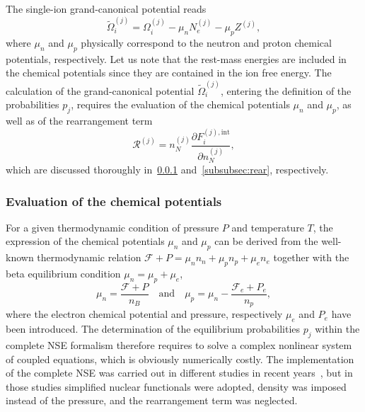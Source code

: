 The single-ion grand-canonical potential reads
%
\begin{equation}
  \tilde{\Omega}_{i}^{(j)} = \Omega_{i}^{(j)} - \mu_n N_e^{(j)} -
  \mu_p Z^{(j)},
\end{equation}
%
where $\mu_n$ and $\mu_p$ physically correspond to the neutron and proton 
chemical potentials, respectively. Let us note that the rest-mass energies are 
included in the chemical potentials since they are contained in the ion 
free energy. 
The calculation of the grand-canonical potential $\tilde{\Omega}_{i}^{(j)}$, 
entering the definition of the probabilities $p_j$, requires the 
evaluation of the chemical potentials $\mu_n$ and $\mu_p$, as well as of the 
rearrangement term
%
\begin{equation}
  \mathcal{R}^{(j)} = n_N^{(j)} 
  \frac{\partial F_i^{(j),\text{int}}}{\partial n_N^{(j)}},
\end{equation}
%
which are discussed thoroughly in~\ref{subsubsec:chempoteval}
and~\ref{subsubsec:rear}, respectively.

\subsubsection{Evaluation of the chemical
potentials}\label{subsubsec:chempoteval}

For a given thermodynamic condition of pressure $P$ and temperature $T$, the
expression of the chemical potentials $\mu_n$ and $\mu_p$ can be derived from 
the well-known thermodynamic relation $\mathcal{F} + P = \mu_n n_n + \mu_p n_p 
+ \mu_e n_e$ together with the beta equilibrium condition $\mu_n = \mu_p + 
\mu_e$,
%
\begin{equation}
  \mu_n = \frac{\mathcal{F} + P}{n_B} \quad \text{and} \quad
  \mu_p = \mu_n - \frac{\mathcal{F}_e + P_e}{n_p},\label{eq:munmup}
\end{equation}
%
where the electron chemical potential and pressure, respectively $\mu_e$ and
$P_e$ have been introduced.
The determination of the equilibrium probabilities $p_j$ within the complete 
NSE formalism therefore requires to solve a complex nonlinear system of coupled 
equations, which is obviously numerically costly. The implementation of 
the complete NSE was carried out in different studies in recent
years~\cite{Oertel2017,Burgio2018}, but in those studies simplified nuclear 
functionals were adopted, density was imposed instead of the pressure, and the 
rearrangement term was neglected.

